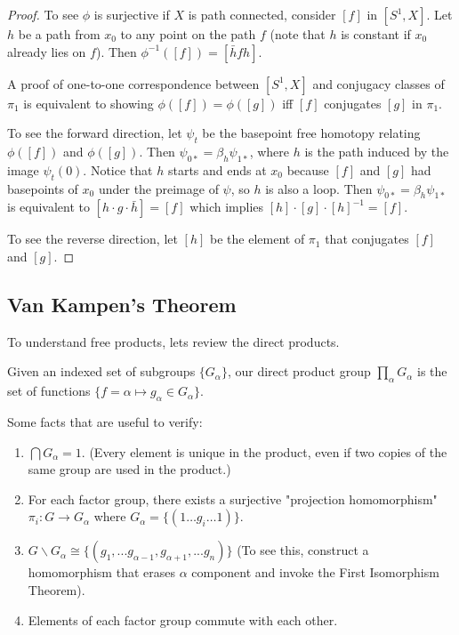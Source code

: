 \documentclass[10pt]{article}
\begin{document}
\begin{proof}
	To see $\phi$ is surjective if $X$ is path connected, consider $[f]$ in $[S^1, X]$. Let $h$ be a path from $x_0$ to any point on the path $f$ (note that $h$ is constant if $x_0$ already lies on $f$). Then $\phi^{-1}([f]) = [\bar{h}fh]$.
	\par A proof of one-to-one correspondence between $[S^1, X]$ and conjugacy classes of $\pi_1$ is equivalent to showing $\phi([f]) = \phi([g])$ iff $[f]$ conjugates $[g]$ in $\pi_1$. 
	\par To see the forward direction, let $\psi_t$ be the basepoint free homotopy relating $\phi([f])$ and $\phi([g])$. Then $\psi_{0*} = \beta_h\psi_{1*}$, where $h$ is the path induced by the image $\psi_t(0)$. Notice that $h$ starts and ends at $x_0$ because $[f]$ and $[g]$ had basepoints of $x_0$ under the preimage of $\psi$, so $h$ is also a loop. Then $\psi_{0*} = \beta_h\psi_{1*}$ is equivalent to $[h \cdot g \cdot \bar{h}] = [f]$ which implies $[h] \cdot [g] \cdot [h]^{-1} = [f]$.
	\par To see the reverse direction, let $[h]$ be the element of $\pi_1$ that conjugates $[f]$ and $[g]$.

\end{proof}

\subsection{Van Kampen's Theorem}

To understand free products, lets review the direct products.

\begin{definition}
	Given an indexed set of subgroups $\{G_{\alpha}\}$, our direct product group $\prod_{\alpha} G_{\alpha}$ is the set of functions $\{ f = \alpha \mapsto g_{\alpha} \in G_{\alpha} \}$.
\end{definition}

Some facts that are useful to verify:

\begin{enumerate}
	\item{$\bigcap G_{\alpha} = 1$. (Every element is unique in the product, even if two copies of the same group are used in the product.)}
	\item{For each factor group, there exists a surjective "projection homomorphism" $\pi_i: G \to G_{\alpha}$ where $G_{\alpha} = \{(1 \dots g_i \dots 1) \}$. }
	\item{ $G \backslash G_{\alpha} \cong \{ (g_1, ... g_{\alpha-1}, g_{\alpha+1}, ...  g_n) \}$ (To see this, construct a homomorphism that erases $\alpha$ component and invoke the First Isomorphism Theorem).}
	\item{Elements of each factor group commute with each other.}
\end{enumerate}
\end{document}
